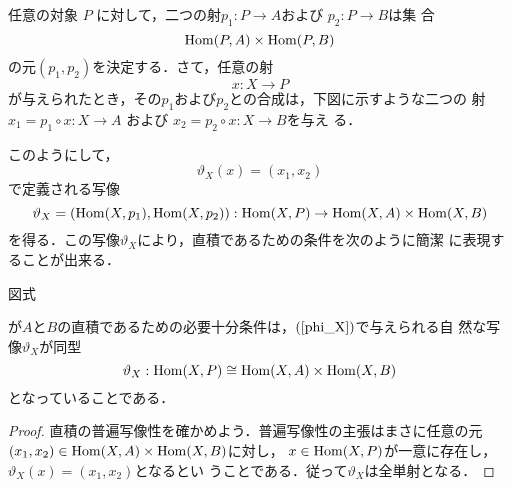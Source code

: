 任意の対象 $P$ に対して，二つの射$p_1: P \to A$および $p_2: P \to B$は集
合
\[
 \mathrm{Hom}(P, A) \times \mathrm{Hom}(P, B)
\]
の元$(p_1, p_2)$を決定する．さて，任意の射
\[
 x: X \to P
\]
が与えられたとき，その$p_1$および$p_2$との合成は，下図に示すような二つの
射$x_1 = p_1 \circ x: X \to A$ および $x_2 = p_2 \circ x: X \to B$を与え
る．
\begin{center}
\end{center}
このようにして，
\begin{equation}
  \vartheta_X(x) = (x_1, x_2)\label{phi_X}
\end{equation}
で定義される写像
\[
 \vartheta_X = (\mathrm{Hom}(X, p_1), \mathrm{Hom}(X, p_2))
           : \mathrm{Hom}(X, P) \to \mathrm{Hom}(X, A) \times \mathrm{Hom}(X, B)
\]
を得る．この写像$\vartheta_X$により，直積であるための条件を次のように簡潔
に表現することが出来る．
\begin{prop}\label{Homs and products}
 図式
 \begin{center}
 \end{center}
 が$A$と$B$の直積であるための必要十分条件は，$(\ref{phi_X})$で与えられる自
 然な写像$\vartheta_X$が同型
 \[
  \vartheta_X: \mathrm{Hom}(X, P) \cong \mathrm{Hom}(X, A) \times \mathrm{Hom}(X, B)
 \]
 となっていることである．
\end{prop}
\begin{proof}
 直積の普遍写像性を確かめよう．普遍写像性の主張はまさに任意の元
 $(x_1, x_2) \in \mathrm{Hom}(X, A) \times \mathrm{Hom}(X, B)$に対し，
 $x \in \mathrm{Hom}(X, P)$が一意に存在し，$\vartheta_X(x) = (x_1, x_2)$となるとい
 うことである．従って$\vartheta_X$は全単射となる．
\end{proof}

